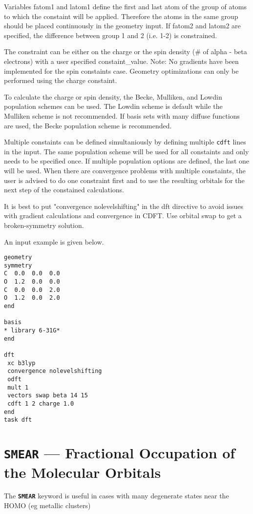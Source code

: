 Variables fatom1 and latom1 define the first and last atom of the group of atoms to which
the constaint will be applied. Therefore the atoms in the same group should be placed 
continuously in the geometry input. If fatom2 and latom2 are specified, the difference between
group 1 and 2 (i.e. 1-2) is constrained. 

The constraint can be either on the charge or the spin density (# of alpha - beta electrons) with
a user specified constaint_value.  Note: No gradients have been implemented for the spin constaints 
case. Geometry optimizations can only be performed using the charge constaint.

To calculate the charge or spin density, the Becke, Mulliken, and Lowdin population schemes can be 
used. The Lowdin scheme is default while the Mulliken scheme is not recommended. If basis sets with 
many diffuse functions are used, the Becke population scheme is recommended.

Multiple constaints can be defined simultaniously by defining multiple {\tt cdft} lines in the input. 
The same population scheme will be used for all constaints and only needs to be specified once. If 
multiple population options are defined, the last one will be used. When there are convergence
problems with multiple constaints, the user is advised to do one constraint first and to use the
resulting orbitals for the next step of the constained calculations.

It is best to put "convergence nolevelshifting" in the dft directive to avoid issues with gradient 
calculations and convergence in CDFT. Use orbital swap to get a broken-symmetry solution.

An input example is given below.

\begin{verbatim}
geometry
symmetry
C  0.0  0.0  0.0
O  1.2  0.0  0.0
C  0.0  0.0  2.0
O  1.2  0.0  2.0
end

basis
* library 6-31G*
end

dft
 xc b3lyp
 convergence nolevelshifting
 odft
 mult 1
 vectors swap beta 14 15
 cdft 1 2 charge 1.0
end
task dft
\end{verbatim}

\section{{\tt SMEAR} --- Fractional Occupation of the Molecular Orbitals}
\label{smear}

The {\tt \bf SMEAR} keyword is useful in cases with many degenerate states
near the HOMO (eg metallic clusters)

